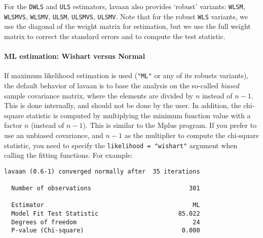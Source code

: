 For the \texttt{DWLS} and \texttt{ULS} estimators, lavaan also provides
`robust' variants: \texttt{WLSM}, \texttt{WLSMVS}, \texttt{WLSMV},
\texttt{ULSM}, \texttt{ULSMVS}, \texttt{ULSMV}. Note that for the robust
\texttt{WLS} variants, we use the diagonal of the weight matrix for
estimation, but we use the full weight matrix to correct the standard
errors and to compute the test statistic.

\hypertarget{ml-estimation-wishart-versus-normal}{%
\paragraph{ML estimation: Wishart versus
Normal}\label{ml-estimation-wishart-versus-normal}}

If maximum likelihood estimation is used (\texttt{"ML"} or any of its
robusts variants), the default behavior of lavaan is to base the
analysis on the so-called \emph{biased} sample covariance matrix, where
the elements are divided by \(n\) instead of \(n-1\). This is done
internally, and should not be done by the user. In addition, the
chi-square statistic is computed by multiplying the minimum function
value with a factor \(n\) (instead of \(n-1\)). This is similar to the
Mplus program. If you prefer to use an unbiased covariance, and \(n-1\)
as the multiplier to compute the chi-square statistic, you need to
specify the \texttt{likelihood\ =\ "wishart"} argument when calling the
fitting functions. For example:

\begin{Shaded}
\begin{Highlighting}[]
\StringTok{ }
            \NormalTok{)}
\end{Highlighting}
\end{Shaded}

\begin{verbatim}
lavaan (0.6-1) converged normally after  35 iterations

  Number of observations                           301

  Estimator                                         ML
  Model Fit Test Statistic                      85.022
  Degrees of freedom                                24
  P-value (Chi-square)                           0.000
\end{verbatim}

